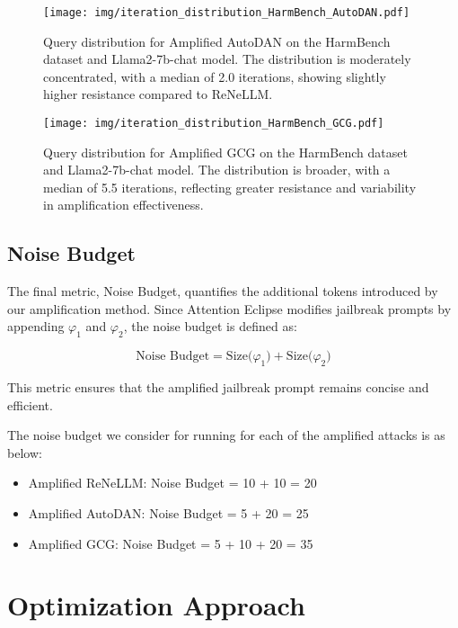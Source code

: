 \begin{figure}[h]
    \centering
    \texttt{[image: img/iteration\_distribution\_HarmBench\_AutoDAN.pdf]}
    \caption{Query distribution for Amplified AutoDAN on the HarmBench dataset and Llama2-7b-chat model. The distribution is moderately concentrated, with a median of 2.0 iterations, showing slightly higher resistance compared to ReNeLLM.}
    \label{fig: iteration_distribution_HarmBench_AutoDAN}
\end{figure}

\begin{figure}[h]
    \centering
    \texttt{[image: img/iteration\_distribution\_HarmBench\_GCG.pdf]}
    \caption{Query distribution for Amplified GCG on the HarmBench dataset and Llama2-7b-chat model. The distribution is broader, with a median of 5.5 iterations, reflecting greater resistance and variability in amplification effectiveness.}
    \label{fig: iteration_distribution_HarmBench_GCG}
\end{figure}

\subsection{Noise Budget}
The final metric, Noise Budget, quantifies the additional tokens introduced by our amplification method. Since Attention Eclipse modifies jailbreak prompts by appending $\varphi_1$ and $\varphi_2$, the noise budget is defined as:

\[
\text{Noise Budget} = \text{Size($\varphi_1$)} + \text{Size($\varphi_2$)}
\]

This metric ensures that the amplified jailbreak prompt remains concise and efficient.

The noise budget we consider for running for each of the amplified attacks is as below:

\begin{itemize}
    \item Amplified ReNeLLM: Noise Budget = 10 + 10 = 20
    \item Amplified AutoDAN: Noise Budget = 5 + 20 = 25
    \item Amplified GCG: Noise Budget = 5 + 10 + 20 = 35
\end{itemize}

\section{Optimization Approach}
\label{sec: optimization}


